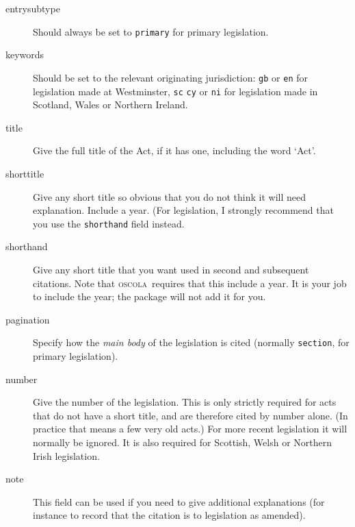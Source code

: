 \documentclass[a4paper,
               11pt,
	       DIV=1,			   
	       footinclude=false]
	      {scrartcl}
\newcommand{\oscolashort}{\textsc{oscola}\nocite{oscola}}
\begin{document}
\begin{description}
\item[entrysubtype] Should always be set to \texttt{primary} for
  primary legislation.
\item[keywords]
Should be set to the relevant originating jurisdiction:
  \texttt{gb} or \texttt{en} for legislation made at Westminster,
  \texttt{sc} \texttt{cy} or \texttt{ni} for legislation made in
  Scotland, Wales or Northern Ireland.
\item[title]
  Give the full title of the Act, if it has one, including
  the word `Act'.
\item[shorttitle]
Give any short title so obvious that you do not
  think it will need explanation. Include a year. (For legislation, I
  strongly recommend that you use the \texttt{shorthand} field
  instead.
\item[shorthand]
Give any short title that you want used in second and
  subsequent citations. Note that \oscolashort\ requires that this
  include a year. It is your job to include the
  year; the package will not add it for you.
\item[pagination]
Specify how the \emph{main body} of the legislation
  is cited (normally \texttt{section}, for primary legislation).
\item[number]
 Give the number of the legislation. This is only
  strictly required for acts that do not have a short title, and are
  therefore cited by number alone. (In practice that means a few very
  old acts.) For more recent legislation it will normally be
  ignored. It is also required for Scottish, Welsh or Northern Irish
  legislation.
\item[note]
This field can be used if you need to give additional
  explanations (for instance to record that the citation is to
  legislation as amended).
\end{description}
\end{document}
